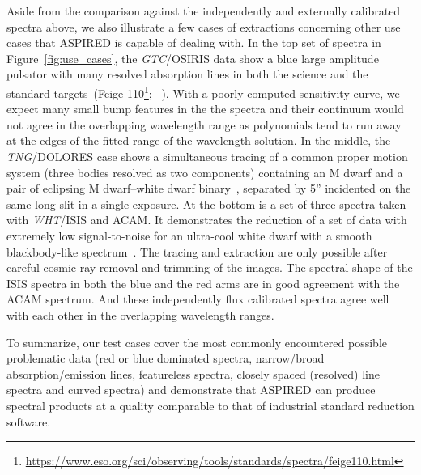 \documentclass[linenumbers, twocolumn]{aastex631}
\begin{document}
Aside from the comparison against the independently and externally calibrated
spectra above, we also illustrate a few cases of extractions concerning
other use cases that \textsc{ASPIRED} is capable of dealing with. In the top set
of spectra in Figure~\ref{fig:use_cases}, the \textit{GTC}/OSIRIS data show a
blue large amplitude pulsator with many resolved absorption lines in both the
science and the standard targets~(Feige 110\footnote{
\url{https://www.eso.org/sci/observing/tools/standards/spectra/feige110.html}};
~\citealp{2022MNRAS.511.4971M}). With a poorly computed sensitivity curve, we
expect many small bump features in the the spectra and their continuum would
not agree in the overlapping wavelength range as polynomials tend to run away
at the edges of the fitted range of the wavelength solution. In the middle,
the \textit{TNG}/DOLORES case shows a simultaneous tracing of a common proper
motion system (three bodies resolved as two components) containing an M dwarf
and a pair of eclipsing M dwarf--white dwarf binary~\citep{2022MNRAS.509.4171K},
separated by 5'' incidented on the same long-slit in a single exposure.
At the bottom is a set of three spectra taken with \textit{WHT}/ISIS and ACAM.
It demonstrates the reduction of a set of data with extremely low signal-to-noise
for an ultra-cool white dwarf with a smooth blackbody-like
spectrum~\citep{2020MNRAS.493.6001L}. The tracing and extraction are only
possible after careful cosmic ray removal and trimming of the images. The
spectral shape of the ISIS spectra in both the blue and the red arms are in good
agreement with the ACAM spectrum. And these independently flux calibrated
spectra agree well with each other in the overlapping wavelength ranges.

To summarize, our test cases cover the most commonly encountered possible
problematic data (red or blue dominated spectra, narrow/broad
absorption/emission lines, featureless spectra, closely spaced (resolved)
line spectra and curved spectra) and demonstrate that \textsc{ASPIRED} can
produce spectral products at a quality comparable to that of industrial
standard reduction software.
\end{document}
